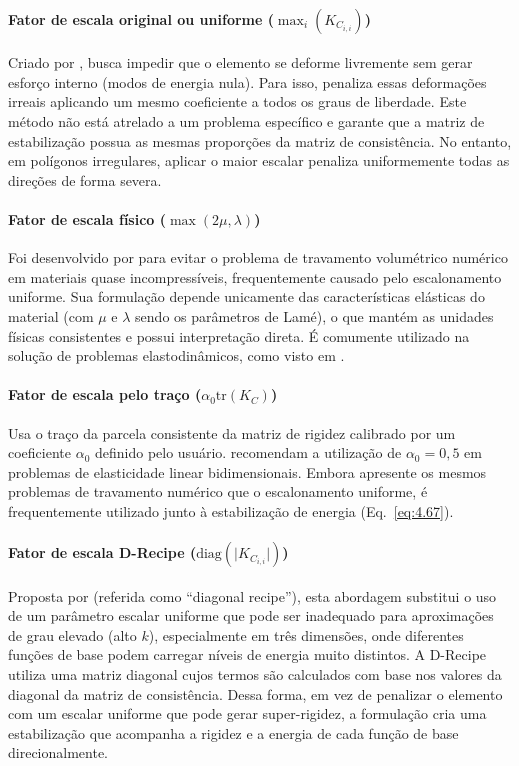     \paragraph{Fator de escala original ou uniforme ($\max_i (K_{C_{i,i}})$)} Criado por \citet{basicprinciplesvirtualelementmethods2013a}, busca impedir que o elemento se deforme livremente sem gerar esforço interno (modos de energia nula). Para isso, penaliza essas deformações irreais aplicando um mesmo coeficiente a todos os graus de liberdade. Este método não está atrelado a um problema específico e garante que a matriz de estabilização possua as mesmas proporções da matriz de consistência. No entanto, em polígonos irregulares, aplicar o maior escalar penaliza uniformemente todas as direções de forma severa.

    \paragraph{Fator de escala físico ($\max(2\mu, \lambda)$)} Foi desenvolvido por \citet{virtualelementslinearelasticityproblems2013} para evitar o problema de travamento volumétrico numérico em materiais quase incompressíveis, frequentemente causado pelo escalonamento uniforme. Sua formulação depende unicamente das características elásticas do material (com $\mu$ e $\lambda$ sendo os parâmetros de Lamé), o que mantém as unidades físicas consistentes e possui interpretação direta. É comumente utilizado na solução de problemas elastodinâmicos, como visto em \citet{antonietti2020virtual}.

    \paragraph{Fator de escala pelo traço ($\alpha_0 \text{tr}(K_C)$)} Usa o traço da parcela consistente da matriz de rigidez calibrado por um coeficiente $\alpha_0$ definido pelo usuário. \citet{arbitraryorder2dvirtualelementspolygonalmeshespartelasticproblem2017a} recomendam a utilização de $\alpha_0 = 0,5$ em problemas de elasticidade linear bidimensionais. Embora apresente os mesmos problemas de travamento numérico que o escalonamento uniforme, é frequentemente utilizado junto à estabilização de energia (Eq.~\ref{eq:4.67}).

    \paragraph{Fator de escala D-Recipe ($\text{diag}(\vert{}K_{C_{i,i}}\vert{})$)} Proposta por \citet{beiraodaveiga2017high} (referida como ``diagonal recipe''), esta abordagem substitui o uso de um parâmetro escalar uniforme que pode ser inadequado para aproximações de grau elevado (alto $k$), especialmente em três dimensões, onde diferentes funções de base podem carregar níveis de energia muito distintos. A D-Recipe utiliza uma matriz diagonal cujos termos são calculados com base nos valores da diagonal da matriz de consistência. Dessa forma, em vez de penalizar o elemento com um escalar uniforme que pode gerar super-rigidez, a formulação cria uma estabilização que acompanha a rigidez e a energia de cada função de base direcionalmente.

